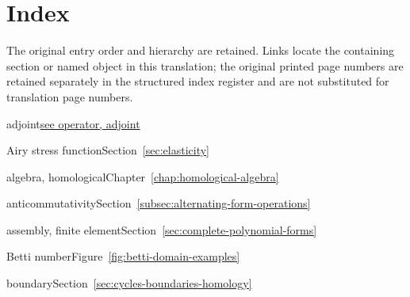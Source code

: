 \clearpage\section*{{Index}}\label{back:index}
{The original entry order and hierarchy are retained. Links locate the containing section or named object in this translation; the original printed page numbers are retained separately in the structured index register and are not substituted for translation page numbers.}
\begingroup\small\setlength{\parindent}{0pt}

\par\noindent\hspace*{0em}\label{index:adjoint}{adjoint}\quad \hyperref[index:operator-adjoint]{{see operator, adjoint}}

\par\noindent\hspace*{0em}\label{index:airy-stress-function}{Airy stress function}\quad Section~\ref{sec:elasticity}

\par\noindent\hspace*{0em}\label{index:algebra-homological}{algebra, homological}\quad Chapter~\ref{chap:homological-algebra}

\par\noindent\hspace*{0em}\label{index:anticommutativity}{anticommutativity}\quad Section~\ref{subsec:alternating-form-operations}

\par\noindent\hspace*{0em}\label{index:assembly-finite-element}{assembly, finite element}\quad Section~\ref{sec:complete-polynomial-forms}

\par\noindent\hspace*{0em}\label{index:betti-number}{Betti number}\quad Figure~\ref{fig:betti-domain-examples}

\par\noindent\hspace*{0em}\label{index:boundary}{boundary}\quad Section~\ref{sec:cycles-boundaries-homology}

